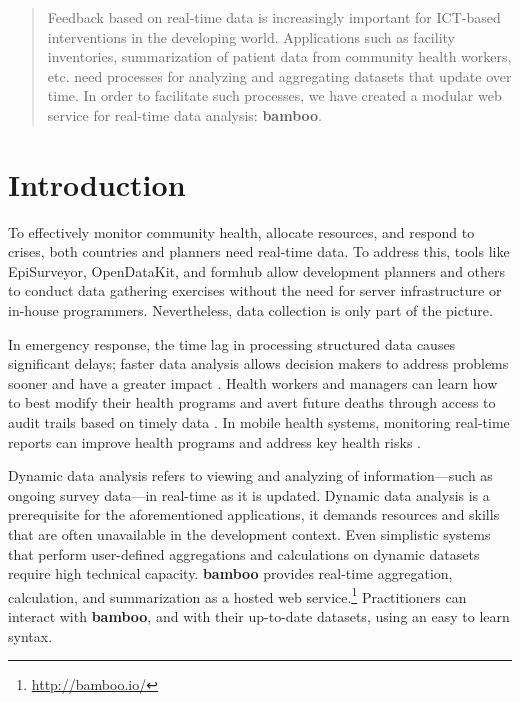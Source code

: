 \documentclass{sig-alternate}
\begin{document}
\maketitle
\begin{abstract}
Feedback based on real-time data is increasingly important for ICT-based interventions in the developing world. Applications such as 
facility inventories,
summarization of patient data from community health workers, 
etc. need processes for analyzing and aggregating datasets that update over
time. In order to facilitate such processes, we have created a modular web
service for real-time data analysis: \textbf{bamboo}.
\end{abstract}




\section{Introduction}
To effectively monitor community health, allocate resources, and respond to crises, both countries and planners need real-time data. 
To address this, tools like EpiSurveyor, OpenDataKit, and
formhub allow development planners and others to conduct data gathering exercises without the need for server infrastructure or in-house programmers.  
Nevertheless, data collection is only part of the picture.

In emergency response, the time lag in processing structured data causes significant delays; faster data analysis allows decision makers to address problems sooner and have a greater impact \cite{internews}.
Health workers and managers can learn how to best modify their health programs
and avert future deaths
through access to audit trails based on timely data \cite{krisberg}.
In mobile health systems, monitoring real-time reports can improve health programs and address key health risks \cite{mechael}.  

Dynamic data analysis refers to viewing and analyzing of information---such as
ongoing survey data---in real-time as it is updated.  Dynamic data analysis is a prerequisite for the
aforementioned applications, it demands resources
and skills that are often unavailable in the development context.  Even
simplistic systems that perform user-defined aggregations and calculations on
dynamic datasets require high technical capacity.  \textbf{bamboo} provides real-time
aggregation, calculation, and summarization as a hosted web
service.\footnote{\url{http://bamboo.io/}}  Practitioners can interact with
\textbf{bamboo}, and with their up-to-date datasets, using an easy to learn syntax.
\end{document}
